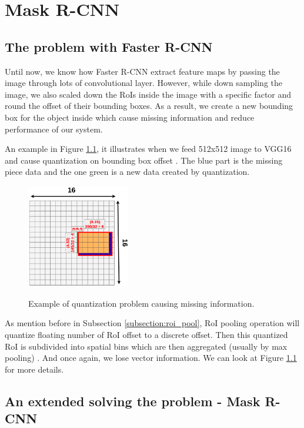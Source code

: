 \chapter{Mask R-CNN}
\noindent

\section{The problem with Faster R-CNN}
\label{section:problemofFasterRCNN}
\noindent

	Until now, we know how Faster R-CNN extract feature maps by passing the image through lots of convolutional layer. However, while down sampling the image, we also scaled down the RoIs inside the image with a specific factor and round the offset of their bounding boxes. As a result, we create a new bounding box for the object inside which cause missing information and reduce performance of our system.
	
	An example in Figure \ref{fig:quantization_problem}, it illustrates when we feed 512x512 image to VGG16 and cause quantization on bounding box offset \cite{roi_align}. The blue part is the missing piece data and the one green is a new data created by quantization.
	
	\begin{figure}[H]
		\centering
		{\includegraphics[width=0.4\textwidth]{./hinhanh/chap5/problem.png}}
		\caption{Example of quantization problem causing missing information.}
		\label{fig:quantization_problem}
	\end{figure}
	
	As mention before in Subsection \ref{subsection:roi_pool}, RoI pooling operation will quantize floating number of RoI offset to a discrete offset. Then this quantized RoI is subdivided into spatial bins which are then aggregated (usually by max pooling) \cite{fasterrcnn}. And once again, we lose vector information. We can look at Figure \ref{fig:quantization_problem} for more details.

\section{An extended solving the problem - Mask R-CNN}
\label{section:maskrcnn}
\noindent

